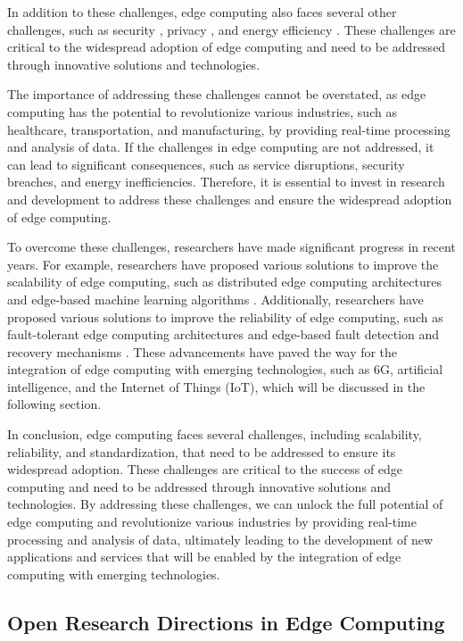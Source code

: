 \documentclass[11pt]{article}
\begin{document}
In addition to these challenges, edge computing also faces several other challenges, such as security \cite{ref16}, privacy \cite{ref107}, and energy efficiency \cite{ref203}. These challenges are critical to the widespread adoption of edge computing and need to be addressed through innovative solutions and technologies.

The importance of addressing these challenges cannot be overstated, as edge computing has the potential to revolutionize various industries, such as healthcare, transportation, and manufacturing, by providing real-time processing and analysis of data. If the challenges in edge computing are not addressed, it can lead to significant consequences, such as service disruptions, security breaches, and energy inefficiencies. Therefore, it is essential to invest in research and development to address these challenges and ensure the widespread adoption of edge computing.

To overcome these challenges, researchers have made significant progress in recent years. For example, researchers have proposed various solutions to improve the scalability of edge computing, such as distributed edge computing architectures \cite{ref204} and edge-based machine learning algorithms \cite{ref7}. Additionally, researchers have proposed various solutions to improve the reliability of edge computing, such as fault-tolerant edge computing architectures \cite{ref205} and edge-based fault detection and recovery mechanisms \cite{ref206}. These advancements have paved the way for the integration of edge computing with emerging technologies, such as 6G, artificial intelligence, and the Internet of Things (IoT), which will be discussed in the following section.

In conclusion, edge computing faces several challenges, including scalability, reliability, and standardization, that need to be addressed to ensure its widespread adoption. These challenges are critical to the success of edge computing and need to be addressed through innovative solutions and technologies. By addressing these challenges, we can unlock the full potential of edge computing and revolutionize various industries by providing real-time processing and analysis of data, ultimately leading to the development of new applications and services that will be enabled by the integration of edge computing with emerging technologies.

\subsection{Open Research Directions in Edge Computing}
\end{document}

